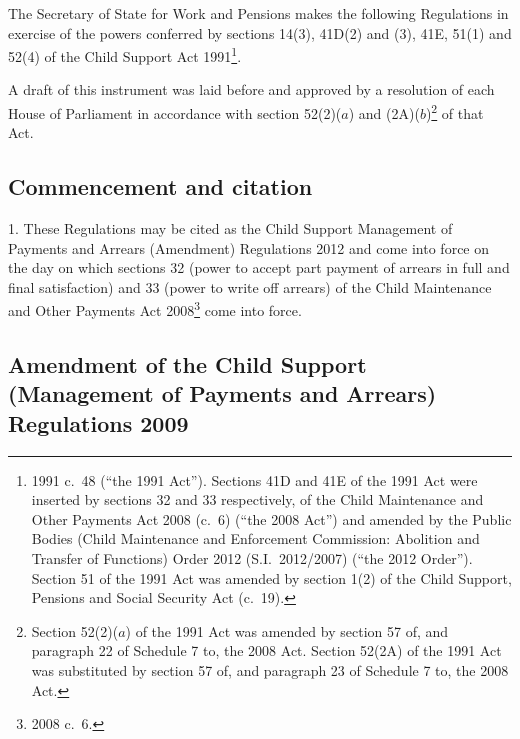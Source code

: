\documentclass[12pt,a4paper]{article}
\title{\regstitle}
\author{S.I.\ 2012 No.\ 3002}
\date{Made
28th November 2012\\
Coming into force
in accordance with regulation 1
}
\begin{document}
\maketitle

\enlargethispage{\baselineskip}

\noindent
The Secretary of State for Work and Pensions makes the following Regulations in exercise of the powers conferred by sections 14(3), 41D(2) and (3), 41E, 51(1) and 52(4) of the Child Support Act 1991\footnote{1991 c.~48 (“the 1991 Act”). Sections 41D and 41E of the 1991 Act were inserted by sections 32 and 33 respectively, of the Child Maintenance and Other Payments Act 2008 (c.~6) (“the 2008 Act”) and amended by the Public Bodies (Child Maintenance and Enforcement Commission: Abolition and Transfer of Functions) Order 2012 (S.I.~2012/2007) (“the 2012 Order”). Section 51 of the 1991 Act was amended by section 1(2) of the Child Support, Pensions and Social Security Act (c.~19).}.

A draft of this instrument was laid before and approved by a resolution of each House of Parliament in accordance with section 52(2)($a$)  and (2A)($b$)\footnote{Section 52(2)($a$)  of the 1991 Act was amended by section 57 of, and paragraph 22 of Schedule 7 to, the 2008 Act. Section 52(2A) of the 1991 Act was substituted by section 57 of, and paragraph 23 of Schedule 7 to, the 2008 Act.} of that Act. 

{\sloppy

\tableofcontents

}

\bigskip

\setcounter{secnumdepth}{-2}

\subsection[1. Commencement and citation]{Commencement and citation}

1.  These Regulations may be cited as the Child Support Management of Payments and Arrears (Amendment) Regulations 2012 and come into force on the day on which sections 32 (power to accept part payment of arrears in full and final satisfaction) and 33 (power to write off arrears) of the Child Maintenance and Other Payments Act 2008\footnote{2008 c.~6.} come into force.

\subsection[2. Amendment of the Child Support (Management of Payments and Arrears) Regulations 2009]{Amendment of the Child Support (Management of Payments and Arrears) Regulations 2009}
\end{document}
